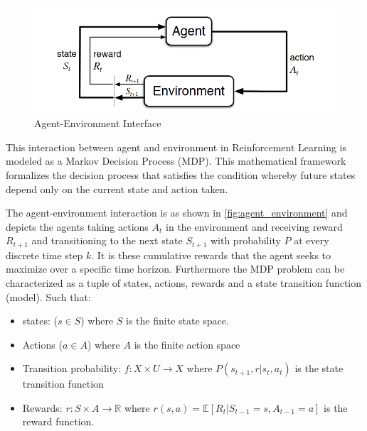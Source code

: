 \begin{figure}[h]
	\centering
	\includegraphics[width=0.75\linewidth]{figures/agent-environment.png}
	\caption{Agent-Environment Interface \cite{suttonReinforcementLearningIntroduction2014}}
	\label{fig:agent_environment}
\end{figure}

This interaction between agent and environment in Reinforcement Learning is modeled as a Markov Decision Process (MDP). This mathematical framework formalizes the decision process that satisfies the condition whereby future states depend only on the current state and action taken.

The agent-environment interaction is as shown in \autoref{fig:agent_environment} and depicts the agents taking actions $A_t$ in the environment and receiving reward $R_{t+1}$ and transitioning to the next state $S_{t+1}$ with probability $P$ at every discrete time step $k$. It is these cumulative rewards that the agent seeks to maximize over a specific time horizon. Furthermore the MDP problem can be characterized as a tuple of states, actions, rewards and a state transition function (model). Such that:

\begin{itemize}
	\item states: ($s\in S$) where $S$ is the finite state space.
	\item Actions ($a \in A$) where $A$ is the finite action space
	\item Transition probability: $f:X\times U \rightarrow X$ where $P(s_{t+1},r | s_t, a_t)$ is the state transition function
	\item Rewards: $r:S\times A \rightarrow \mathbb{R}$ where $r(s,a) = \mathbb{E}[R_t | S_{t-1} =s, A_{t-1} = a]$  is the reward function.
\end{itemize}


